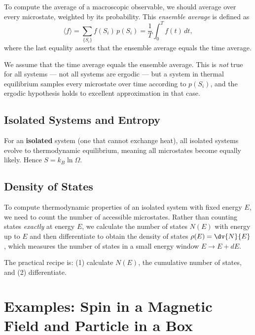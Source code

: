 \begin{definition}
To compute the average of a macroscopic observable, we should average over every microstate, weighted by its probability. This \emph{ensemble average} is defined as
\begin{equation}
    \langle f \rangle = \sum_{\{S_i\}} f(S_i)\,p(S_i) = \frac{1}{T}\int_0^T f(t)\,dt,
\end{equation}
where the last equality asserts that the ensemble average equals the time average.
\end{definition}

We assume that the time average equals the ensemble average. This is \emph{not} true for all systems — not all systems are ergodic — but a system in thermal equilibrium samples every microstate over time according to $p(S_i)$, and the ergodic hypothesis holds to excellent approximation in that case.

\subsection{Isolated Systems and Entropy}

For an \textbf{isolated} system (one that cannot exchange heat), all isolated systems evolve to thermodynamic equilibrium, meaning all microstates become equally likely. Hence $S = k_B\ln\Omega$.

\subsection{Density of States}

\begin{definition}
To compute thermodynamic properties of an isolated system with fixed energy $E$, we need to count the number of accessible microstates. Rather than counting states \emph{exactly} at energy $E$, we calculate the number of states $N(E)$ with energy up to $E$ and then differentiate to obtain the density of states $\rho(E) = \dv{N}{E}$, which measures the number of states in a small energy window $E \to E + dE$.
\end{definition}

The practical recipe is: (1) calculate $N(E)$, the cumulative number of states, and (2) differentiate.


\section{Examples: Spin in a Magnetic Field and Particle in a Box}

